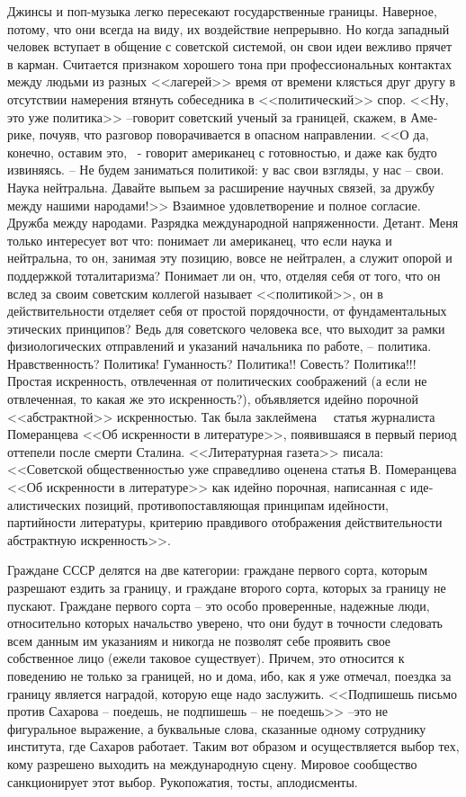 \documentclass{book}
\begin{document}
Джинсы и поп-музыка легко пересекают государственные границы. Наверное, потому, что они всегда на виду, их воздей­ствие непрерывно. Но когда западный человек вступает в об­щение с советской системой, он свои идеи вежливо прячет в карман. Считается признаком хорошего тона при професси­ональных контактах между людьми из разных <<лагерей>> время от времени клясться друг другу в отсутствии намерения втя­нуть собеседника в <<политический>> спор. <<Ну, это уже политика>> --говорит советский ученый за границей, скажем, в Аме­рике, почуяв, что разговор поворачивается в опасном направ­лении. <<О да, конечно, оставим это, ~- говорит американец с готовностью, и даже как будто извиняясь. -- Не будем зани­маться политикой: у вас свои взгляды, у нас -- свои. Наука нейтральна. Давайте выпьем за расширение научных связей, за дружбу между нашими народами!>> Взаимное удовлетворе­ние и полное согласие. Дружба между народами. Разрядка меж­дународной напряженности. Детант. Меня только интересует вот что: понимает ли американец, 
что 
если наука и нейтральна, то он, занимая эту позицию, вовсе не нейтрален, а служит опо­рой и поддержкой тоталитаризма? Понимает ли он, что, отделяя себя от того, что он вслед за своим советским коллегой назы­вает <<политикой>>, он в действительности отделяет себя от простой порядочности, от фундаментальных этических прин­ципов? Ведь для советского человека все, что выходит за рамки физиологических отправлений и указаний начальника по рабо­те, -- политика. Нравственность? Политика! Гуманность? По­литика!! Совесть? Политика!!! Простая искренность, отвлечен­ная от политических соображений (а если не отвлеченная, то какая же это искренность?), объявляется идейно порочной <<абстрактной>> искренностью. Так была заклеймена   статья журналиста Померанцева <<Об искренности в литературе>>, по­явившаяся в первый период оттепели после смерти Сталина. <<Литературная газета>> писала: <<Советской общественностью уже справедливо оценена статья В. Померанцева <<Об искрен­ности в литературе>> как идейно порочная, написанная с 
иде­алистических позиций, противопоставляющая принципам идей­ности, партийности литературы, критерию правдивого отобра­жения действительности абстрактную искренность>>.%

Граждане СССР делятся на две категории: граждане перво­го сорта, которым разрешают ездить за границу, и граждане второго сорта, которых за границу не пускают. Граждане пер­вого сорта -- это особо проверенные, надежные люди, относи­тельно которых начальство уверено, что они будут в точности следовать всем данным им указаниям и никогда не позволят себе проявить свое собственное лицо (ежели таковое существует). Причем, это относится к поведению не только за границей, но и дома, ибо, как я уже отмечал, поездка за границу является наградой, которую еще надо заслужить. <<Подпишешь письмо против Сахарова -- поедешь, не подпишешь -- не пое­дешь>> --это не фигуральное выражение, а буквальные слова, сказанные одному сотруднику института, где Сахаров рабо­тает. Таким вот образом и осуществляется выбор тех, кому разрешено выходить на международную сцену. Мировое сооб­щество санкционирует этот выбор. Рукопожатия, тосты, апло­дисменты.
\end{document}
